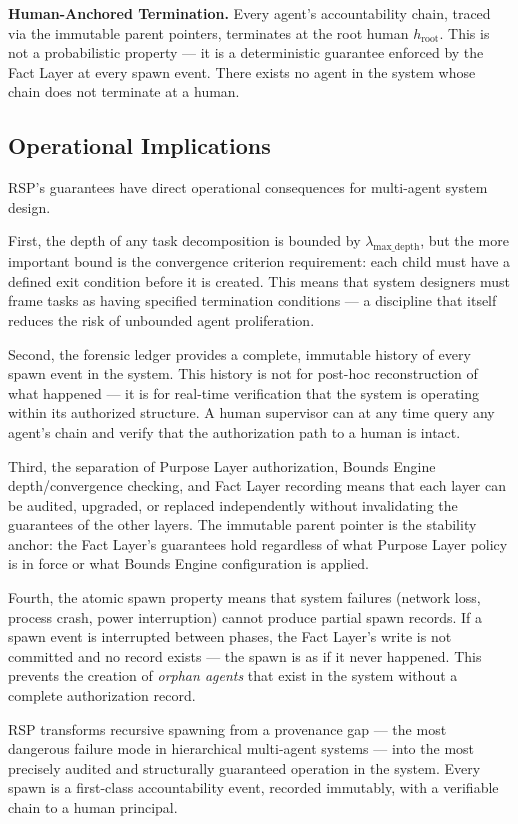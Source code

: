 \bigskip
\noindent\textbf{Human-Anchored Termination.} Every agent's accountability chain, traced via the immutable parent pointers, terminates at the root human $h_{\text{root}}$. This is not a probabilistic property — it is a deterministic guarantee enforced by the Fact Layer at every spawn event. There exists no agent in the system whose chain does not terminate at a human.

\subsection{Operational Implications}

RSP's guarantees have direct operational consequences for multi-agent system design.

First, the depth of any task decomposition is bounded by $\lambda_{\text{max\_depth}}$, but the more important bound is the convergence criterion requirement: each child must have a defined exit condition before it is created. This means that system designers must frame tasks as having specified termination conditions — a discipline that itself reduces the risk of unbounded agent proliferation.

Second, the forensic ledger provides a complete, immutable history of every spawn event in the system. This history is not for post-hoc reconstruction of what happened — it is for real-time verification that the system is operating within its authorized structure. A human supervisor can at any time query any agent's chain and verify that the authorization path to a human is intact.

Third, the separation of Purpose Layer authorization, Bounds Engine depth/convergence checking, and Fact Layer recording means that each layer can be audited, upgraded, or replaced independently without invalidating the guarantees of the other layers. The immutable parent pointer is the stability anchor: the Fact Layer's guarantees hold regardless of what Purpose Layer policy is in force or what Bounds Engine configuration is applied.

Fourth, the atomic spawn property means that system failures (network loss, process crash, power interruption) cannot produce partial spawn records. If a spawn event is interrupted between phases, the Fact Layer's write is not committed and no record exists — the spawn is as if it never happened. This prevents the creation of \emph{orphan agents} that exist in the system without a complete authorization record.

RSP transforms recursive spawning from a provenance gap — the most dangerous failure mode in hierarchical multi-agent systems — into the most precisely audited and structurally guaranteed operation in the system. Every spawn is a first-class accountability event, recorded immutably, with a verifiable chain to a human principal.